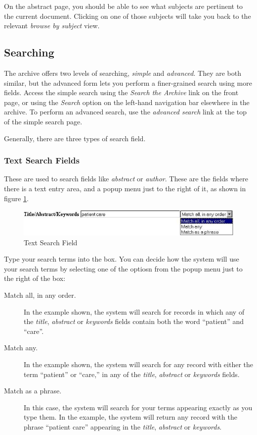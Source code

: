 On the abstract page, you should be able to see what subjects are pertinent to the current document. Clicking on one of those subjects will take you back to the relevant \emph{browse by subject} view.


\subsection{Searching}

The archive offers two levels of searching, \emph{simple} and \emph{advanced}. They are both similar, but the advanced form lets you perform a finer-grained search using more fields. Access the simple search using the \emph{Search the Archive} link on the front page, or using the \emph{Search} option on the left-hand navigation bar elsewhere in the archive. To perform an advanced search, use the \emph{advanced search} link at the top of the simple search page.

Generally, there are three types of search field.

\subsubsection{Text Search Fields}

These are used to search fields like \emph{abstract} or \emph{author}. These are the fields where there is a text entry area, and a popup menu just to the right of it, as shown in figure \ref{searchfield}.

\begin{figure}
\centerline{\includegraphics[width=4.8in]{images/text-search-field}}
\caption{\label{searchfield} Text Search Field}
\end{figure}

Type your search terms into the box. You can decide how the system will use your search terms by selecting one of the optiosn from the popup menu just to the right of the box:

\begin{description}
\item[Match all, in any order.] In the example shown, the system will search for records in which any of the \emph{title}, \emph{abstract} or \emph{keywords} fields contain both the word ``patient'' and ``care''.
\item[Match any.] In the example shown, the system will search for any record with either the term ``patient'' or ``care,'' in any of the \emph{title}, \emph{abstract} or \emph{keywords} fields.
\item[Match as a phrase.] In this case, the system will search for your terms appearing exactly as you type them. In the example, the system will return any record with the phrase ``patient care'' appearing in the \emph{title}, \emph{abstract} or \emph{keywords}.
\end{description}


